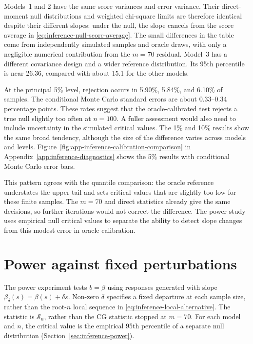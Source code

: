 Models~1 and 2 have the same score variances and error variance.  Their
direct-moment null distributions and weighted chi-square limits are
therefore identical despite their different slopes: under the null, the
slope cancels from the score average in
\eqref{eq:inference-null-score-average}.  The small differences in the table
come from independently simulated samples and oracle draws, with only a
negligible numerical contribution from the $m=70$ residual.  Model~3 has
a different covariance design and a wider reference distribution.  Its
95th percentile is near 26.36, compared with about 15.1 for the other models.

At the principal 5\% level, rejection occurs in 5.90\%, 5.84\%, and
6.10\% of samples.  The conditional Monte Carlo standard errors are about
0.33--0.34 percentage points.  These rates suggest that the oracle-calibrated
test rejects a true null slightly too often at $n=100$.  A fuller assessment
would also need to include uncertainty in the simulated critical values.
The 1\% and 10\% results show the same broad tendency, although the size
of the difference varies across models and levels.
Figure~\ref{fig:app-inference-calibration-comparison} in
Appendix~\ref{app:inference-diagnostics} shows the 5\% results with
conditional Monte Carlo error bars.

This pattern agrees with the quantile comparison: the oracle reference
understates the upper tail and sets critical values that are slightly too
low for these finite samples.  The $m=70$ and direct statistics already
give the same decisions, so further iterations would not correct the
difference.  The power study uses empirical null critical values to
separate the ability to detect slope changes from this modest error in
oracle calibration.

\section{Power against fixed perturbations}
\label{sec:inference-results-power}

The power experiment tests $b=\beta$ using responses generated with slope
$\beta_\delta(s)=\beta(s)+\delta s$.  Non-zero $\delta$ specifies a fixed
departure at each sample size, rather than the root-$n$ local sequence in
\eqref{eq:inference-local-alternative}.  The statistic is $\mathcal S_n$,
rather than the CG statistic stopped at $m=70$.  For each model and $n$, the
critical value is the empirical 95th percentile of a separate null distribution
(Section~\ref{sec:inference-power}).

